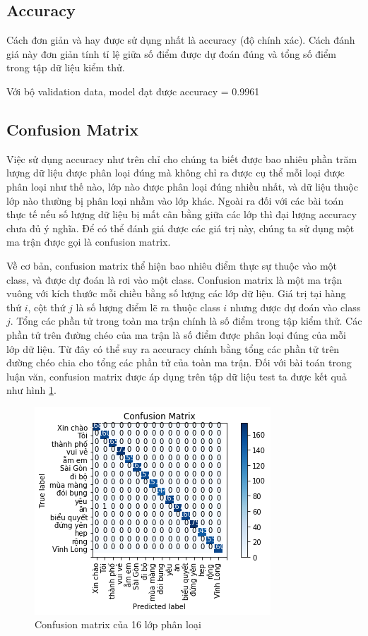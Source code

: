 \subsection{Accuracy}
Cách đơn giản và hay được sử dụng nhất là accuracy (độ chính xác). Cách đánh giá này đơn giản tính tỉ lệ giữa số điểm được dự đoán đúng và tổng số điểm trong tập dữ liệu kiểm thử.

Với bộ validation data, model đạt được accuracy = 0.9961
\subsection{Confusion Matrix}
Việc sử dụng accuracy như trên chỉ cho chúng ta biết được bao nhiêu phần trăm lượng dữ liệu được phân loại đúng mà không chỉ ra được cụ thể mỗi loại được phân loại như thế nào, lớp nào được phân loại đúng nhiều nhất, và dữ liệu thuộc lớp nào thường bị phân loại nhầm vào lớp khác. Ngoài ra đối với các bài toán thực tế nếu số lượng dữ liệu bị mất cân bằng giữa các lớp thì đại lượng accuracy chưa đủ ý nghĩa. Để có thể đánh giá được các giá trị này, chúng ta sử dụng một ma trận được gọi là confusion matrix.

Về cơ bản, confusion matrix thể hiện bao nhiêu điểm thực sự thuộc vào một class, và được dự đoán là rơi vào một class. Confusion matrix là một ma trận vuông với kích thước mỗi chiều bằng số lượng các lớp dữ liệu. Giá trị tại hàng thứ $i$, cột thứ $j$ là số lượng điểm lẽ ra thuộc class $i$ nhưng được dự đoán vào class $j$. Tổng các phần tử trong toàn ma trận chính là số điểm trong tập kiểm thử. Các phần tử trên đường chéo của ma trận là số điểm được phân loại đúng của mỗi lớp dữ liệu. Từ đây có thể suy ra accuracy chính bằng tổng các phần tử trên đường chéo chia cho tổng các phần tử của toàn ma trận. Đối với bài toán trong luận văn, confusion matrix được áp dụng trên tập dữ liệu test ta được kết quả như hình \ref{fig:confusion_matrix}.

\FloatBarrier
\begin{figure}[htp]
\begin{center}
\includegraphics[scale=1]{chap6/c6_figs/confusion_matrix.png}
\end{center}
\caption{Confusion matrix của 16 lớp phân loại}
\label{fig:confusion_matrix}
\end{figure}
\FloatBarrier

